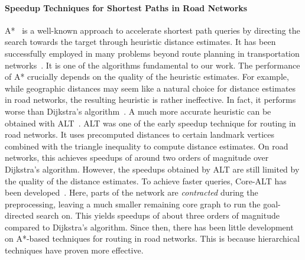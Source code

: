 \documentclass[manuscript,review]{acmart}
\begin{document}
\paragraph{Speedup Techniques for Shortest Paths in Road Networks}
A*~\cite{hnr-afbhd-68} is a well-known approach to accelerate shortest path queries by directing the search towards the target through heuristic distance estimates.
It has been successfully employed in many problems beyond route planning in transportation networks~\cite{DBLP:conf/socs/StrasserHB14,DBLP:conf/ijcai/BonoGHS19,DBLP:conf/ijcai/0002UJAKK18}.
It is one of the algorithms fundamental to our work.
The performance of A* crucially depends on the quality of the heuristic estimates.
For example, while geographic distances may seem like a natural choice for distance estimates in road networks, the resulting heuristic is rather ineffective.
In fact, it performs worse than Dijkstra's algorithm~\cite{gh-cspas-05}.
A much more accurate heuristic can be obtained with ALT~\cite{gh-cspas-05,gw-cppsp-05}.
ALT was one of the early speedup technique for routing in road networks.
It uses precomputed distances to certain landmark vertices combined with the triangle inequality to compute distance estimates.
On road networks, this achieves speedups of around two orders of magnitude over Dijkstra's algorithm.
However, the speedups obtained by ALT are still limited by the quality of the distance estimates.
To achieve faster queries, Core-ALT has been developed~\cite{bdsssw-chgds-10}.
Here, parts of the network are \emph{contracted} during the preprocessing, leaving a much smaller remaining core graph to run the goal-directed search on.
This yields speedups of about three orders of magnitude compared to Dijkstra's algorithm.
Since then, there has been little development on A*-based techniques for routing in road networks.
This is because hierarchical techniques have proven more effective.
\end{document}
